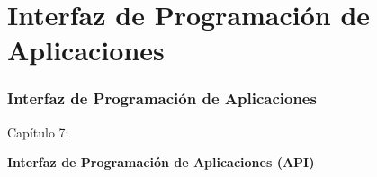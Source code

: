 %

\section{Interfaz de Programación de Aplicaciones}
\begin{frame}[fragile]
	\frametitle{Interfaz de Programación de Aplicaciones}

	\begin{center}\huge{Capítulo 7:}\end{center}
	\begin{center}\huge{\color{typo3darkgrey}\textbf{Interfaz de Programación de Aplicaciones (API)}}\end{center}

\end{frame}


